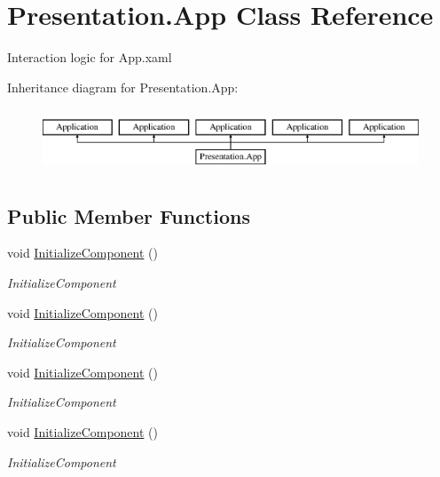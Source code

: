 \hypertarget{class_presentation_1_1_app}{}\section{Presentation.\+App Class Reference}
\label{class_presentation_1_1_app}


Interaction logic for App.\+xaml  


Inheritance diagram for Presentation.\+App\+:\begin{figure}[H]
\begin{center}
\leavevmode
\includegraphics[height=1.914530cm]{class_presentation_1_1_app}
\end{center}
\end{figure}
\subsection*{Public Member Functions}
\begin{DoxyCompactItemize}
\item 
void \hyperlink{class_presentation_1_1_app_a7460ac4ca59a6b42035e0415cff24413}{Initialize\+Component} ()
\begin{DoxyCompactList}\small\item\em Initialize\+Component \end{DoxyCompactList}\item 
void \hyperlink{class_presentation_1_1_app_a7460ac4ca59a6b42035e0415cff24413}{Initialize\+Component} ()
\begin{DoxyCompactList}\small\item\em Initialize\+Component \end{DoxyCompactList}\item 
void \hyperlink{class_presentation_1_1_app_a7460ac4ca59a6b42035e0415cff24413}{Initialize\+Component} ()
\begin{DoxyCompactList}\small\item\em Initialize\+Component \end{DoxyCompactList}\item 
void \hyperlink{class_presentation_1_1_app_a7460ac4ca59a6b42035e0415cff24413}{Initialize\+Component} ()
\begin{DoxyCompactList}\small\item\em Initialize\+Component \end{DoxyCompactList}\end{DoxyCompactItemize}
